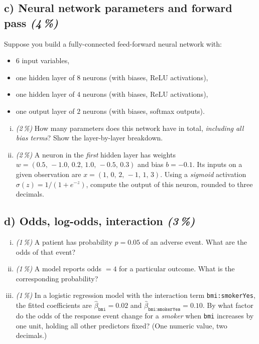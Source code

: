 \documentclass[11pt,a4paper]{article}
\newcommand{\subpoints}[1]{\textit{(#1\,\%)}}
\begin{document}
\subsection*{c) Neural network parameters and forward pass \subpoints{4}}
Suppose you build a fully-connected feed-forward neural network with:
\begin{itemize}
  \item $6$ input variables,
  \item one hidden layer of $8$ neurons (with biases, ReLU activations),
  \item one hidden layer of $4$ neurons (with biases, ReLU activations),
  \item one output layer of $2$ neurons (with biases, softmax outputs).
\end{itemize}

\begin{enumerate}[(i)]
  \item \subpoints{2} How many parameters does this network have in total, \emph{including all bias terms}? Show the layer-by-layer breakdown.
  \item \subpoints{2} A neuron in the \emph{first} hidden layer has weights $w = (0.5,\,-1.0,\,0.2,\,1.0,\,-0.5,\,0.3)$ and bias $b = -0.1$. Its inputs on a given observation are $x = (1,\,0,\,2,\,-1,\,1,\,3)$. Using a \emph{sigmoid} activation $\sigma(z) = 1/(1+e^{-z})$, compute the output of this neuron, rounded to three decimals.
\end{enumerate}

\subsection*{d) Odds, log-odds, interaction \subpoints{3}}
\begin{enumerate}[(i)]
  \item \subpoints{1} A patient has probability $p = 0.05$ of an adverse event. What are the odds of that event?
  \item \subpoints{1} A model reports odds $= 4$ for a particular outcome. What is the corresponding probability?
  \item \subpoints{1} In a logistic regression model with the interaction term \texttt{bmi:smokerYes}, the fitted coefficients are $\hat\beta_{\texttt{bmi}}=0.02$ and $\hat\beta_{\texttt{bmi:smokerYes}}=0.10$. By what factor do the odds of the response event change for a \emph{smoker} when \texttt{bmi} increases by one unit, holding all other predictors fixed? (One numeric value, two decimals.)
\end{enumerate}
\end{document}
